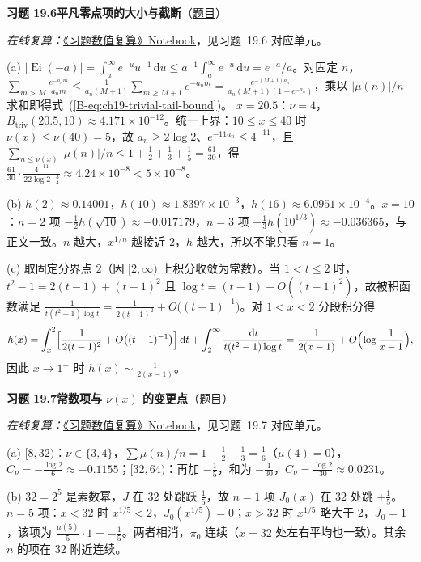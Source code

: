 \documentclass[11pt,a4paper]{article}
\DeclareMathOperator{\Ei}{Ei}
\newcommand{\dd}{\,\mathrm{d}}
\newcommand{\bref}[1]{\ref*{B-#1}}
\newcommand{\Sol}[2]{%
  \par\addvspace{1.2em}\noindent
  \hypertarget{s:#1}{}\textbf{习题 #1\quad #2}\hfill{\small（\hyperlink{q:#1}{题目}）}\par
  \nopagebreak\smallskip}
\begin{document}
\Sol{19.6}{平凡零点项的大小与截断}
\emph{在线复算：}\href{https://colab.research.google.com/github/lichengtong123/lichengtong-RH/blob/main/\%E4\%B9\%A0\%E9\%A2\%98\%E4\%B8\%8E\%E8\%A7\%A3\%E7\%AD\%94/\%E4\%B9\%A0\%E9\%A2\%98\%E6\%95\%B0\%E5\%80\%BC\%E5\%A4\%8D\%E7\%AE\%97.ipynb}{《习题数值复算》Notebook}，见习题~19.6 对应单元。

(a) $|\Ei(-a)|=\int_a^\infty e^{-u}u^{-1}\dd u\le a^{-1}\int_a^\infty e^{-u}\dd u=e^{-a}/a$。对固定 $n$，$\sum_{m>M}\frac{e^{-a_nm}}{a_nm}\le\frac{1}{a_n(M+1)}\sum_{m\ge M+1}e^{-a_nm}=\frac{e^{-(M+1)a_n}}{a_n(M+1)(1-e^{-a_n})}$，乘以 $|\mu(n)|/n$ 求和即得式~(\bref{eq:ch19-trivial-tail-bound})。
$x=20.5$：$\nu=4$，$B_{\mathrm{triv}}(20.5,10)\approx4.171\times10^{-12}$。统一上界：$10\le x\le40$ 时 $\nu(x)\le\nu(40)=5$，故 $a_n\ge2\log2$、$e^{-11a_n}\le4^{-11}$，且 $\sum_{n\le\nu(x)}|\mu(n)|/n\le1+\frac12+\frac13+\frac15=\frac{61}{30}$，得 $\frac{61}{30}\cdot\frac{4^{-11}}{22\log2\cdot\frac34}\approx4.24\times10^{-8}<5\times10^{-8}$。

(b) $h(2)\approx0.14001$，$h(10)\approx1.8397\times10^{-3}$，$h(16)\approx6.0951\times10^{-4}$。$x=10$：$n=2$ 项 $-\frac12h(\sqrt{10})\approx-0.017179$，$n=3$ 项 $-\frac13h(10^{1/3})\approx-0.036365$，与正文一致。$n$ 越大，$x^{1/n}$ 越接近 $2$，$h$ 越大，所以不能只看 $n=1$。

(c) 取固定分界点 $2$（因 $[2,\infty)$ 上积分收敛为常数）。当 $1<t\le2$ 时，$t^2-1=2(t-1)+(t-1)^2$ 且 $\log t=(t-1)+O((t-1)^2)$，故被积函数满足 $\frac1{t(t^2-1)\log t}=\frac1{2(t-1)^2}+O\bigl((t-1)^{-1}\bigr)$。对 $1<x<2$ 分段积分得
\[
  h(x)=\int_x^2\Bigl[\frac1{2(t-1)^2}+O\bigl((t-1)^{-1}\bigr)\Bigr]\dd t+\int_2^\infty\frac{\dd t}{t(t^2-1)\log t}
  =\frac1{2(x-1)}+O\Bigl(\log\frac1{x-1}\Bigr),
\]
因此 $x\to1^+$ 时 $h(x)\sim\frac1{2(x-1)}$。

\Sol{19.7}{常数项与 $\nu(x)$ 的变更点}
\emph{在线复算：}\href{https://colab.research.google.com/github/lichengtong123/lichengtong-RH/blob/main/\%E4\%B9\%A0\%E9\%A2\%98\%E4\%B8\%8E\%E8\%A7\%A3\%E7\%AD\%94/\%E4\%B9\%A0\%E9\%A2\%98\%E6\%95\%B0\%E5\%80\%BC\%E5\%A4\%8D\%E7\%AE\%97.ipynb}{《习题数值复算》Notebook}，见习题~19.7 对应单元。

(a) $[8,32)$：$\nu\in\{3,4\}$，$\sum\mu(n)/n=1-\frac12-\frac13=\frac16$（$\mu(4)=0$），$C_\nu=-\frac{\log2}6\approx-0.1155$；$[32,64)$：再加 $-\frac15$，和为 $-\frac1{30}$，$C_\nu=\frac{\log2}{30}\approx0.0231$。

(b) $32=2^5$ 是素数幂，$J$ 在 $32$ 处跳跃 $\frac15$，故 $n=1$ 项 $J_0(x)$ 在 $32$ 处跳 $+\frac15$。$n=5$ 项：$x<32$ 时 $x^{1/5}<2$，$J_0(x^{1/5})=0$；$x>32$ 时 $x^{1/5}$ 略大于 $2$，$J_0=1$，该项为 $\frac{\mu(5)}5\cdot1=-\frac15$。两者相消，$\pi_0$ 连续（$x=32$ 处左右平均也一致）。其余 $n$ 的项在 $32$ 附近连续。
\end{document}
